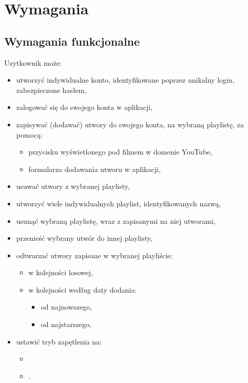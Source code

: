 \section{Wymagania}
\subsection{Wymagania funkcjonalne}
Uzytkownik może:
\renewcommand\labelitemii{$\bullet$}
\renewcommand\labelitemiii{$\bullet$}
\begin{itemize}
    \item utworzyć indywidualne konto, identyfikowane poprzez unikalny login, zabezpieczone hasłem,
    \item zalogować się do swojego konta w aplikacji,
    \item zapisywać (dodawać) utwory do swojego konta, na wybraną playlistę, za pomocą:
          \begin{itemize}
              \item przycisku wyświetlonego pod filmem w domenie YouTube,
              \item formularza dodawania utworu w aplikacji,
          \end{itemize}
    \item usuwać utwory z wybranej playlisty,
    \item utworzyć wiele indywidualnych playlist, identyfikowanych nazwą,
    \item usunąć wybraną playlistę, wraz z zapisanymi na niej utworami,
    \item przenieść wybrany utwór do innej playlisty,
    \item odtwarzać utwory zapisane w wybranej playliście:
          \begin{itemize}
              \item w kolejności losowej,
              \item w kolejności według daty dodania:
                    \begin{itemize}
                        \item od najnowszego,
                        \item od najstarszego,
                    \end{itemize}
          \end{itemize}
    \item ustawić tryb zapętlenia na:
          \begin{itemize}
              \item {}
              \item {}.
          \end{itemize}
\end{itemize}

